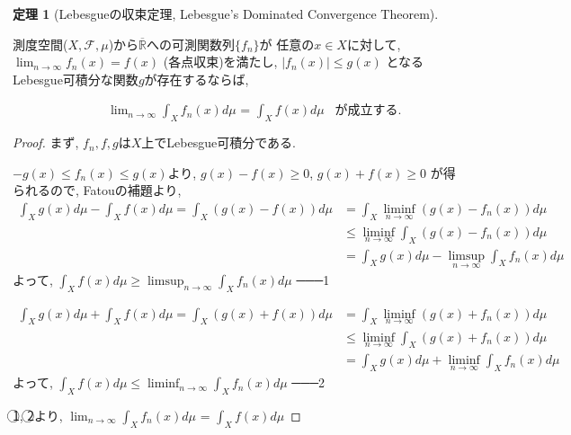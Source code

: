\documentclass[12pt]{amsart}
\theoremstyle{definiton}
\newtheorem{theorem}{定理}
\begin{document}
\bigskip

\begin{theorem}[Lebesgueの収束定理, Lebesgue's Dominated Convergence Theorem]
\end{theorem}

測度空間($X, \mathcal{F}, \mu$)から$\overline{\mathbb{R}}$への可測関数列$\{f_n\}$が
任意の$x \in X$に対して, $\displaystyle \lim_{n \to \infty} f_n(x) = f(x)$ (各点収束)を満たし, 
$|f_n(x)| \le g(x)$ となるLebesgue可積分な関数$g$が存在するならば, 

 \ \ \ \ \ \ \ \ \ \ \ \ \ \ \ $\displaystyle \lim_{n \to \infty} \displaystyle \int_X f_n(x) d\mu$ =
$\displaystyle \int_X f(x) d\mu$ \ が成立する.

\bigskip

\begin{proof}
まず, $f_n, f, g$は$X$上でLebesgue可積分である.

$-g(x) \le f_n(x) \le g(x)$より, $g(x)-f(x) \ge 0$, 
$g(x) + f(x) \ge 0$ が得られるので, Fatouの補題より, 
\begin{align*}
\displaystyle \int_X g(x) d\mu - \displaystyle \int_X f(x) d\mu
= \displaystyle \int_X (g(x) - f(x)) d\mu
&= \displaystyle \int_X \displaystyle \liminf_{n \to \infty} (g(x) - f_n(x)) d\mu \\
&\le \displaystyle \liminf_{n \to \infty} \displaystyle \int_X (g(x) - f_n(x)) d\mu \\
&= \displaystyle \int_X g(x) d\mu - \displaystyle \limsup_{n \to \infty} \displaystyle \int_X f_n(x) d\mu
\end{align*}
よって, $\displaystyle \int_X f(x) d\mu \ge \displaystyle \limsup_{n \to \infty} \displaystyle \int_X f_n(x) d\mu$
───\textcircled{\scriptsize 1}

\begin{align*}
\displaystyle \int_X g(x) d\mu + \displaystyle \int_X f(x) d\mu
= \displaystyle \int_X (g(x) + f(x)) d\mu
&= \displaystyle \int_X \displaystyle \liminf_{n \to \infty} (g(x) + f_n(x)) d\mu \\
&\le \displaystyle \liminf_{n \to \infty} \displaystyle \int_X (g(x) + f_n(x)) d\mu \\
&= \displaystyle \int_X g(x) d\mu + \displaystyle \liminf_{n \to \infty} \displaystyle \int_X f_n(x) d\mu
\end{align*}
よって, $\displaystyle \int_X f(x) d\mu \le \displaystyle \liminf_{n \to \infty} \displaystyle \int_X f_n(x) d\mu$
───\textcircled{\scriptsize 2}

\textcircled{\scriptsize 1}, \textcircled{\scriptsize 2}より, 
$\displaystyle \lim_{n \to \infty} \displaystyle \int_X f_n(x) d\mu$ =
$\displaystyle \int_X f(x) d\mu$
\end{proof}
\end{document}
